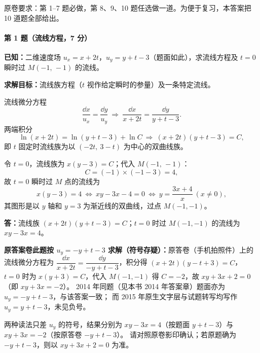 
\noindent 原卷要求：第 1--7 题必做，第 8、9、10 题任选做一道。为便于复习，本答案把 10 道题全部给出。

\paragraph{第 1 题（流线方程，7 分）}
\begin{jie}
\textbf{已知：}二维速度场 $u_x=x+2t$，$u_y=y+t-3$（题面如此），求流线方程及 $t=0$ 瞬时过
$M(-1,\,-1)$ 的流线。

\textbf{求解目标：}流线族方程（$t$ 视作给定瞬时的参量）及一条特定流线。

流线微分方程
\[
\frac{\dd x}{u_x}=\frac{\dd y}{u_y}
\ \Longrightarrow\
\frac{\dd x}{x+2t}=\frac{\dd y}{y+t-3}.
\]
两端积分
\[
\ln(x+2t)=\ln(y+t-3)+\ln C
\ \Longrightarrow\
(x+2t)(y+t-3)=C ,
\]
即 $t$ 固定时流线族为以 $(-2t,\ 3-t)$ 为中心的双曲线族。

令 $t=0$，流线族为 $x(y-3)=C$；代入 $M(-1,\,-1)$：
\[
C=(-1)\times(-1-3)=4 ,
\]
故 $t=0$ 瞬时过 $M$ 点的流线为
\[
x(y-3)=4\ \Longleftrightarrow\ xy-3x-4=0
\ \Longleftrightarrow\ y=\frac{3x+4}{x}\ (x\neq0),
\]
其图形是以 $y$ 轴和 $y=3$ 为渐近线的双曲线，过点 $M(-1,-1)$。

\textbf{答：}流线族 $(x+2t)(y+t-3)=C$；$t=0$ 时过 $M(-1,-1)$ 的流线为 $xy-3x=4$。
\end{jie}

\begin{tishi}
\textbf{原答案卷此题按 $u_y=-y+t-3$ 求解（符号存疑）：}原答卷（手机拍照件）上的流线微分方程为
$\dfrac{\dd x}{x+2t}=\dfrac{\dd y}{-y+t-3}$，积分得 $(x+2t)(y-t+3)=C$，
$t=0$ 时为 $x(y+3)=C$，代入 $M(-1,-1)$ 得 $C=-2$，故 $xy+3x+2=0$（即 $xy+3x=-2$）。
2014 年同题（见本书 2014 年答案章）题面亦为 $u_y=-y+t-3$，与该答案一致；
而 2015 年原生文字层与试题转写均写作 $u_y=y+t-3$，未见负号。

两种读法只差 $u_y$ 的符号，结果分别为
$xy-3x=4$（按题面 $y+t-3$）与 $xy+3x=-2$（按原答卷 $-y+t-3$）。
请对照原卷影印确认；若原题确为 $-y+t-3$，则以 $xy+3x+2=0$ 为准。
\end{tishi}


